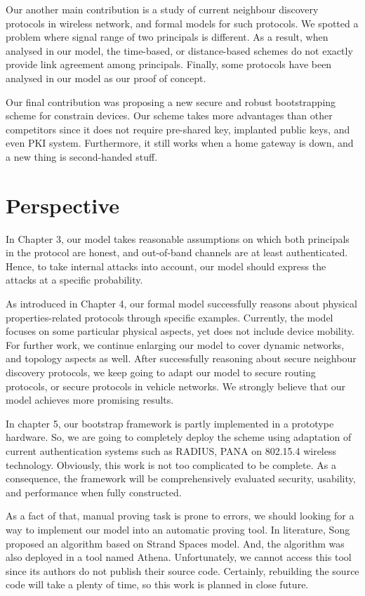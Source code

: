 Our another main contribution is a study of current neighbour discovery protocols in wireless network, and formal models for such protocols. We spotted a problem where signal range of two principals is different. As a result, when analysed in our model, the time-based, or distance-based schemes do not exactly provide link agreement among principals. Finally, some protocols have been analysed in our model as our proof of concept. 
 
Our final contribution was proposing a new secure and robust bootstrapping scheme for constrain devices. Our scheme takes more advantages than other competitors since it does not require pre-shared key, implanted public keys, and even PKI system. Furthermore, it still works when a home gateway is down, and a new thing is second-handed stuff. 

\section{Perspective}

In Chapter 3, our model takes reasonable assumptions on which both principals in the protocol are honest, and out-of-band channels are at least authenticated. Hence, to take internal attacks into account, our model should express the attacks at a specific probability.

As introduced in Chapter 4, our formal model successfully reasons about physical properties-related protocols through specific examples. Currently, the model focuses on some particular physical aspects, yet does not include device mobility. For further work, we continue enlarging our model to cover dynamic networks, and topology aspects as well. After successfully reasoning about secure neighbour discovery protocols, we keep going to adapt our model to secure routing protocols, or secure protocols in vehicle networks. We strongly believe that our model achieves more promising results. 

In chapter 5, our bootstrap framework is partly implemented in a prototype hardware. So, we are going to completely deploy the scheme using adaptation of current authentication systems such as RADIUS, PANA on 802.15.4 wireless technology. Obviously, this work is not too complicated to be complete. As a consequence, the framework will be comprehensively evaluated security, usability, and performance when fully constructed. 

As a fact of that, manual proving task is prone to errors, we should looking for a way to implement our model into an automatic proving tool. In literature, Song~\cite{Song:1999:ANE:794199.795118} proposed an algorithm based on Strand Spaces model. And, the algorithm was also deployed in a tool named Athena. Unfortunately, we cannot access this tool since its authors do not publish their source code. Certainly, rebuilding the source code will take a plenty of time, so this work is planned in close future. 

